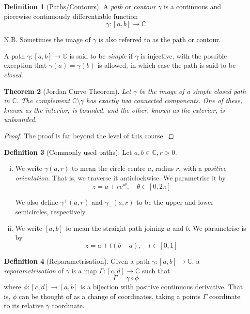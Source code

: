 \documentclass[10pt,fleqn]{article}
\newcommand{\comps}{\mathbb{C}}
\theoremstyle{definition} \newtheorem{defn}{Definition}[section]
\theoremstyle{plain}      \newtheorem{thm}[defn]{Theorem}
\theoremstyle{definition} \newtheorem{prop}[defn]{Proposition}
\theoremstyle{plain}      \newtheorem{lem}[defn]{Lemma}
\theoremstyle{definition} \newtheorem{cor}[defn]{Corollary}
\theoremstyle{definition} \newtheorem{ex}[defn]{Example}
\theoremstyle{definition} \newtheorem{rem}[defn]{Remark}
\begin{document}
\begin{defn}[Paths/Contours]
    A \emph{path} or \emph{contour} $\gamma$ is a continuous and piecewise continuously differentiable function
    \begin{equation}
        \gamma:[a,b]\to\comps
    \end{equation}

    N.B. Sometimes the image of $\gamma$ is also referred to as the path or contour.

    A path $\gamma:[a,b]\to\comps$ is said to be \emph{simple} if $\gamma$ is injective, with the possible exception that $\gamma(a)=\gamma(b)$ is allowed, in which case the path is said to be \emph{closed}.
\end{defn}

\begin{thm}[Jordan Curve Theorem]
    Let $\gamma$ be the image of a simple closed path in $\comps$.
    The complement $\comps\setminus\gamma$ has exactly two connected components.
    One of these, known as the \emph{interior}, is bounded, and the other, known as the \emph{exterior}, is unbounded.
\end{thm}

\begin{proof}
    The proof is far beyond the level of this course.
\end{proof}

\begin{defn}[Commonly used paths]
    Let $a,b\in\comps,r>0$.
    \begin{enumerate}[(i)]
        \item We write $\gamma(a,r)$ to mean the circle centre $a$, radius $r$, with a \emph{positive orientation}.
        That is, we traverse it anticlockwise.
        We parametrise it by
        \[
            z=a+re^{i\theta},\quad
            \theta\in[0,2\pi]
        \]

        We also define $\gamma^+(a,r)$ and $\gamma_-(a,r)$ to be the upper and lower semicircles, respectively.
        \item We write $[a,b]$ to mean the straight path joining $a$ and $b$.
        We parametrise is by
        \[
            z=a+t(b-a),\quad
            t\in[0,1]
        \]
    \end{enumerate}
\end{defn}

\begin{defn}[Reparametrisation]
    Given a path $\gamma:[a,b]\to\comps$, a \emph{reparametrisation} of $\gamma$ is a map $\Gamma:[c,d]\to\comps$ such that
    \[
        \Gamma=
        \gamma\circ\phi
    \]
    where $\phi:[c,d]\to[a,b]$ is a bijection with positive continuous derivative.
    That is, $\phi$ can be thought of as a change of coordinates, taking a points $\Gamma$ coordinate to its relative $\gamma$ coordinate.
\end{defn}
\end{document}
